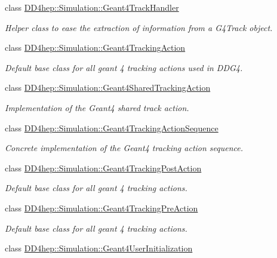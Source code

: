\begin{DoxyCompactItemize}
class \hyperlink{class_d_d4hep_1_1_simulation_1_1_geant4_track_handler}{D\+D4hep\+::\+Simulation\+::\+Geant4\+Track\+Handler}
\begin{DoxyCompactList}\small\item\em Helper class to ease the extraction of information from a G4\+Track object. \end{DoxyCompactList}\item 
class \hyperlink{class_d_d4hep_1_1_simulation_1_1_geant4_tracking_action}{D\+D4hep\+::\+Simulation\+::\+Geant4\+Tracking\+Action}
\begin{DoxyCompactList}\small\item\em Default base class for all geant 4 tracking actions used in D\+D\+G4. \end{DoxyCompactList}\item 
class \hyperlink{class_d_d4hep_1_1_simulation_1_1_geant4_shared_tracking_action}{D\+D4hep\+::\+Simulation\+::\+Geant4\+Shared\+Tracking\+Action}
\begin{DoxyCompactList}\small\item\em Implementation of the Geant4 shared track action. \end{DoxyCompactList}\item 
class \hyperlink{class_d_d4hep_1_1_simulation_1_1_geant4_tracking_action_sequence}{D\+D4hep\+::\+Simulation\+::\+Geant4\+Tracking\+Action\+Sequence}
\begin{DoxyCompactList}\small\item\em Concrete implementation of the Geant4 tracking action sequence. \end{DoxyCompactList}\item 
class \hyperlink{class_d_d4hep_1_1_simulation_1_1_geant4_tracking_post_action}{D\+D4hep\+::\+Simulation\+::\+Geant4\+Tracking\+Post\+Action}
\begin{DoxyCompactList}\small\item\em Default base class for all geant 4 tracking actions. \end{DoxyCompactList}\item 
class \hyperlink{class_d_d4hep_1_1_simulation_1_1_geant4_tracking_pre_action}{D\+D4hep\+::\+Simulation\+::\+Geant4\+Tracking\+Pre\+Action}
\begin{DoxyCompactList}\small\item\em Default base class for all geant 4 tracking actions. \end{DoxyCompactList}\item 
class \hyperlink{class_d_d4hep_1_1_simulation_1_1_geant4_user_initialization}{D\+D4hep\+::\+Simulation\+::\+Geant4\+User\+Initialization}

\end{DoxyCompactItemize}
